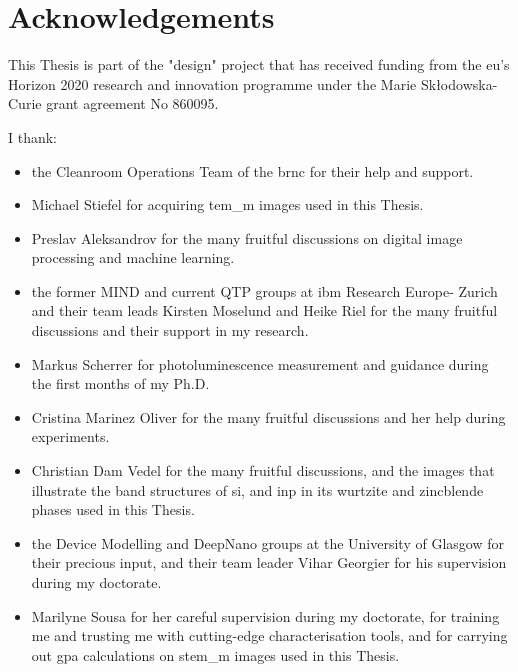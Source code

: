 \chapter{Acknowledgements}

This Thesis is part of the "\acl{design}" project that has received funding from the \acl{eu}’s Horizon 2020 research and innovation programme under the Marie Skłodowska-Curie grant agreement No 860095. 

I thank:
\begin{itemize}
    \item the Cleanroom Operations Team of the \acl{brnc} for their help and support. 
    \item Michael Stiefel for acquiring \acl{tem_m} images used in this Thesis. 
    \item Preslav Aleksandrov for the many fruitful discussions on digital image processing and machine learning.
    \item the former MIND and current QTP groups at \acs{ibm} Research Europe- Zurich and their team leads Kirsten Moselund and Heike Riel for the many fruitful discussions and their support in my research.
    \item Markus Scherrer for photoluminescence measurement and guidance during the first months of my Ph.D. 
    \item Cristina Marinez Oliver for the many fruitful discussions and her help during experiments.
    \item Christian Dam Vedel for the many fruitful discussions, and the images that illustrate the band structures of \acs{si}, and \acs{inp} in its wurtzite and zincblende phases used in this Thesis.
    \item the Device Modelling and DeepNano groups at the University of Glasgow for their precious input, and their team leader Vihar Georgier for his supervision during my doctorate.
    \item Marilyne Sousa for her careful supervision during my doctorate, for training me and trusting me with cutting-edge characterisation tools, and for carrying out \acs{gpa} calculations on \acs{stem_m} images used in this Thesis. 
\end{itemize}



